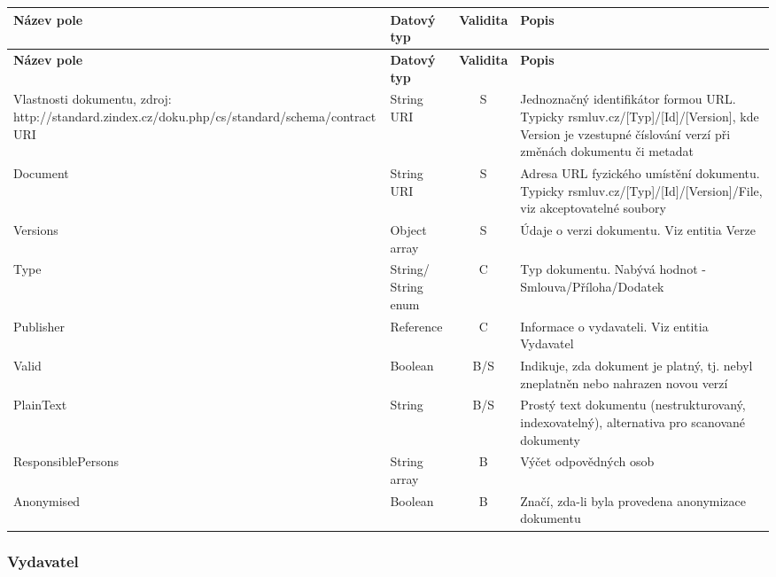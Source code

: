 \begin{center}
\begin{longtable}{lp{20mm}cp{65mm}}
\label{grid_mlmmh} \\
\multicolumn{1}{l}{\textbf{Název pole}} & 
\multicolumn{1}{l}{\textbf{Datový typ}} & 
\multicolumn{1}{l}{\textbf{Validita}} & 
\multicolumn{1}{l}{\textbf{Popis}} \\ \hline 
\endfirsthead
\multicolumn{1}{l}{\textbf{Název pole}} & 
\multicolumn{1}{l}{\textbf{Datový typ}} & 
\multicolumn{1}{l}{\textbf{Validita}} & 
\multicolumn{1}{l}{\textbf{Popis}} \\ \hline 
\hline
\endhead
\endfoot
\caption{Vlastnosti dokumentu, zdroj:\\http://standard.zindex.cz/doku.php/cs/standard/schema/contract}
\endlastfoot
\rowcolor{validateS}URI & String URI & S & Jednoznačný identifikátor formou URL. Typicky rsmluv.cz/[Typ]/[Id]/[Version], kde Version je vzestupné číslování verzí při změnách dokumentu či metadat \\
\rowcolor{validateS}Document & String URI & S & Adresa URL fyzického umístění dokumentu. Typicky rsmluv.cz/[Typ]/[Id]/[Version]/File, viz akceptovatelné soubory \\
\rowcolor{validateS}Versions & Object array & S & Údaje o verzi dokumentu. Viz entitia Verze \\
\rowcolor{validateC}Type & String/ String enum & C & Typ dokumentu. Nabývá hodnot - Smlouva/Příloha/Dodatek \\
\rowcolor{validateC}Publisher & Reference & C & Informace o vydavateli. Viz entitia Vydavatel \\
\rowcolor{validateB}Valid & Boolean & B/S & Indikuje, zda dokument je platný, tj. nebyl zneplatněn nebo nahrazen novou verzí \\
\rowcolor{validateB}PlainText & String & B/S & Prostý text dokumentu (nestrukturovaný, indexovatelný), alternativa pro scanované dokumenty \\
\rowcolor{validateB}ResponsiblePersons & String array & B & Výčet odpovědných osob \\
\rowcolor{validateB}Anonymised & Boolean & B & Značí, zda-li byla provedena anonymizace dokumentu \\
\end{longtable}
\end{center}

\subsubsection*{Vydavatel}

